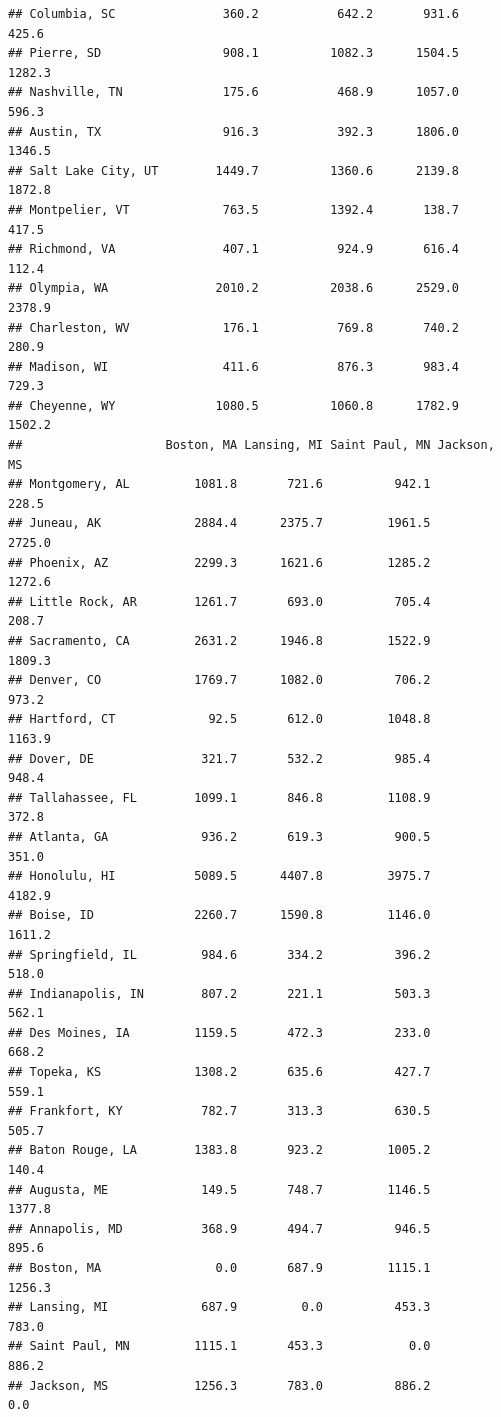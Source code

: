 \documentclass[
]{article}
\begin{document}
\begin{verbatim}
## Columbia, SC               360.2           642.2       931.6         425.6
## Pierre, SD                 908.1          1082.3      1504.5        1282.3
## Nashville, TN              175.6           468.9      1057.0         596.3
## Austin, TX                 916.3           392.3      1806.0        1346.5
## Salt Lake City, UT        1449.7          1360.6      2139.8        1872.8
## Montpelier, VT             763.5          1392.4       138.7         417.5
## Richmond, VA               407.1           924.9       616.4         112.4
## Olympia, WA               2010.2          2038.6      2529.0        2378.9
## Charleston, WV             176.1           769.8       740.2         280.9
## Madison, WI                411.6           876.3       983.4         729.3
## Cheyenne, WY              1080.5          1060.8      1782.9        1502.2
##                    Boston, MA Lansing, MI Saint Paul, MN Jackson, MS
## Montgomery, AL         1081.8       721.6          942.1       228.5
## Juneau, AK             2884.4      2375.7         1961.5      2725.0
## Phoenix, AZ            2299.3      1621.6         1285.2      1272.6
## Little Rock, AR        1261.7       693.0          705.4       208.7
## Sacramento, CA         2631.2      1946.8         1522.9      1809.3
## Denver, CO             1769.7      1082.0          706.2       973.2
## Hartford, CT             92.5       612.0         1048.8      1163.9
## Dover, DE               321.7       532.2          985.4       948.4
## Tallahassee, FL        1099.1       846.8         1108.9       372.8
## Atlanta, GA             936.2       619.3          900.5       351.0
## Honolulu, HI           5089.5      4407.8         3975.7      4182.9
## Boise, ID              2260.7      1590.8         1146.0      1611.2
## Springfield, IL         984.6       334.2          396.2       518.0
## Indianapolis, IN        807.2       221.1          503.3       562.1
## Des Moines, IA         1159.5       472.3          233.0       668.2
## Topeka, KS             1308.2       635.6          427.7       559.1
## Frankfort, KY           782.7       313.3          630.5       505.7
## Baton Rouge, LA        1383.8       923.2         1005.2       140.4
## Augusta, ME             149.5       748.7         1146.5      1377.8
## Annapolis, MD           368.9       494.7          946.5       895.6
## Boston, MA                0.0       687.9         1115.1      1256.3
## Lansing, MI             687.9         0.0          453.3       783.0
## Saint Paul, MN         1115.1       453.3            0.0       886.2
## Jackson, MS            1256.3       783.0          886.2         0.0

\end{verbatim}
\end{document}
